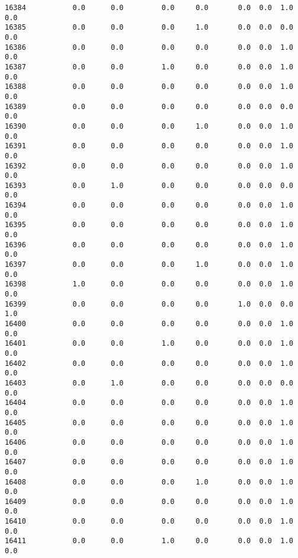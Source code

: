 \documentclass[11pt]{article}
\begin{document}
\begin{verbatim}
16384           0.0      0.0         0.0     0.0       0.0  0.0  1.0   0.0   
16385           0.0      0.0         0.0     1.0       0.0  0.0  0.0   0.0   
16386           0.0      0.0         0.0     0.0       0.0  0.0  1.0   0.0   
16387           0.0      0.0         1.0     0.0       0.0  0.0  1.0   0.0   
16388           0.0      0.0         0.0     0.0       0.0  0.0  1.0   0.0   
16389           0.0      0.0         0.0     0.0       0.0  0.0  0.0   0.0   
16390           0.0      0.0         0.0     1.0       0.0  0.0  1.0   0.0   
16391           0.0      0.0         0.0     0.0       0.0  0.0  1.0   0.0   
16392           0.0      0.0         0.0     0.0       0.0  0.0  1.0   0.0   
16393           0.0      1.0         0.0     0.0       0.0  0.0  0.0   0.0   
16394           0.0      0.0         0.0     0.0       0.0  0.0  1.0   0.0   
16395           0.0      0.0         0.0     0.0       0.0  0.0  1.0   0.0   
16396           0.0      0.0         0.0     0.0       0.0  0.0  1.0   0.0   
16397           0.0      0.0         0.0     1.0       0.0  0.0  1.0   0.0   
16398           1.0      0.0         0.0     0.0       0.0  0.0  1.0   0.0   
16399           0.0      0.0         0.0     0.0       1.0  0.0  0.0   1.0   
16400           0.0      0.0         0.0     0.0       0.0  0.0  1.0   0.0   
16401           0.0      0.0         1.0     0.0       0.0  0.0  1.0   0.0   
16402           0.0      0.0         0.0     0.0       0.0  0.0  1.0   0.0   
16403           0.0      1.0         0.0     0.0       0.0  0.0  0.0   0.0   
16404           0.0      0.0         0.0     0.0       0.0  0.0  1.0   0.0   
16405           0.0      0.0         0.0     0.0       0.0  0.0  1.0   0.0   
16406           0.0      0.0         0.0     0.0       0.0  0.0  1.0   0.0   
16407           0.0      0.0         0.0     0.0       0.0  0.0  1.0   0.0   
16408           0.0      0.0         0.0     1.0       0.0  0.0  1.0   0.0   
16409           0.0      0.0         0.0     0.0       0.0  0.0  1.0   0.0   
16410           0.0      0.0         0.0     0.0       0.0  0.0  1.0   0.0   
16411           0.0      0.0         1.0     0.0       0.0  0.0  1.0   0.0   


\end{verbatim}
\end{document}
